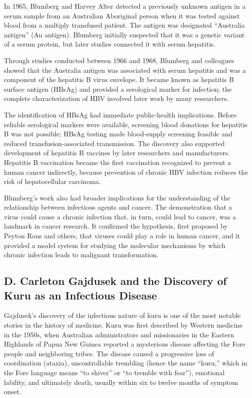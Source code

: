 In 1965, Blumberg and Harvey Alter detected a previously unknown antigen in a serum sample from an Australian Aboriginal person when it was tested against blood from a multiply transfused patient. The antigen was designated ``Australia antigen'' (Au antigen). Blumberg initially suspected that it was a genetic variant of a serum protein, but later studies connected it with serum hepatitis.

Through studies conducted between 1966 and 1968, Blumberg and colleagues showed that the Australia antigen was associated with serum hepatitis and was a component of the hepatitis B virus envelope. It became known as hepatitis B surface antigen (HBsAg) and provided a serological marker for infection; the complete characterization of HBV involved later work by many researchers.

The identification of HBsAg had immediate public-health implications. Before reliable serological markers were available, screening blood donations for hepatitis B was not possible; HBsAg testing made blood-supply screening feasible and reduced transfusion-associated transmission. The discovery also supported development of hepatitis B vaccines by later researchers and manufacturers. Hepatitis B vaccination became the first vaccination recognized to prevent a human cancer indirectly, because prevention of chronic HBV infection reduces the risk of hepatocellular carcinoma.

Blumberg's work also had broader implications for the understanding of the relationship between infectious agents and cancer. The demonstration that a virus could cause a chronic infection that, in turn, could lead to cancer, was a landmark in cancer research. It confirmed the hypothesis, first proposed by Peyton Rous and others, that viruses could play a role in human cancer, and it provided a model system for studying the molecular mechanisms by which chronic infection leads to malignant transformation.

\subsection{D. Carleton Gajdusek and the Discovery of Kuru as an Infectious Disease}

Gajdusek's discovery of the infectious nature of kuru is one of the most notable stories in the history of medicine. Kuru was first described by Western medicine in the 1950s, when Australian administrators and missionaries in the Eastern Highlands of Papua New Guinea reported a mysterious disease affecting the Fore people and neighboring tribes. The disease caused a progressive loss of coordination (ataxia), uncontrollable trembling (hence the name ``kuru,'' which in the Fore language means ``to shiver'' or ``to tremble with fear''), emotional lability, and ultimately death, usually within six to twelve months of symptom onset.

